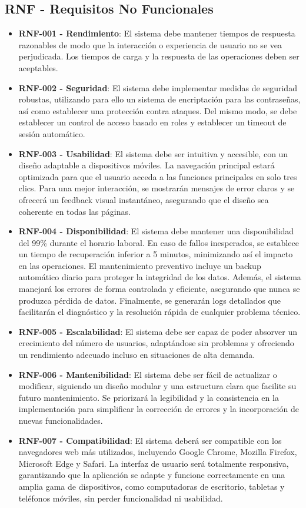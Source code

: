 \subsection{RNF - Requisitos No Funcionales}
\begin{itemize}
\tightlist
\item
\textbf{RNF-001 - Rendimiento}: El sistema debe mantener tiempos de respuesta razonables de modo que la interacción o experiencia de usuario no se vea perjudicada. Los tiempos de carga y la respuesta de las operaciones deben ser aceptables.
\item
\textbf{RNF-002 - Seguridad}: El sistema debe implementar medidas de seguridad robustas, utilizando para ello un sistema de encriptación para las contraseñas, así como establecer una protección contra ataques. Del mismo modo, se debe establecer un control de acceso basado en roles y establecer un timeout de sesión automático.
\item
\textbf{RNF-003 - Usabilidad}: El sistema debe ser intuitiva y accesible, con un diseño adaptable a dispositivos móviles. La navegación principal estará optimizada para que el usuario acceda a las funciones principales en solo tres clics. Para una mejor interacción, se mostrarán mensajes de error claros y se ofrecerá un feedback visual instantáneo, asegurando que el diseño sea coherente en todas las páginas.

\item
\textbf{RNF-004 - Disponibilidad}: El sistema debe mantener una disponibilidad del 99\% durante el horario laboral. En caso de fallos inesperados, se establece un tiempo de recuperación inferior a 5 minutos, minimizando así el impacto en las operaciones. El mantenimiento preventivo incluye un backup automático diario para proteger la integridad de los datos. Además, el sistema manejará los errores de forma controlada y eficiente, asegurando que nunca se produzca pérdida de datos. Finalmente, se generarán logs detallados que facilitarán el diagnóstico y la resolución rápida de cualquier problema técnico.
\item
\textbf{RNF-005 - Escalabilidad}: El sistema debe ser capaz de poder absorver un crecimiento del número de usuarios, adaptándose sin problemas y ofreciendo un rendimiento adecuado incluso en situaciones de alta demanda.
\item
\textbf{RNF-006 - Mantenibilidad}: El sistema debe ser fácil de actualizar o modificar, siguiendo un diseño modular y una estructura clara que facilite su futuro mantenimiento. Se priorizará la legibilidad y la consistencia en la implementación para simplificar la corrección de errores y la incorporación de nuevas funcionalidades.
\item
\textbf{RNF-007 - Compatibilidad}: El sistema deberá ser compatible con los navegadores web más utilizados, incluyendo Google Chrome, Mozilla Firefox, Microsoft Edge y Safari. La interfaz de usuario será totalmente responsiva, garantizando que la aplicación se adapte y funcione correctamente en una amplia gama de dispositivos, como computadoras de escritorio, tabletas y teléfonos móviles, sin perder funcionalidad ni usabilidad.
\end{itemize}

